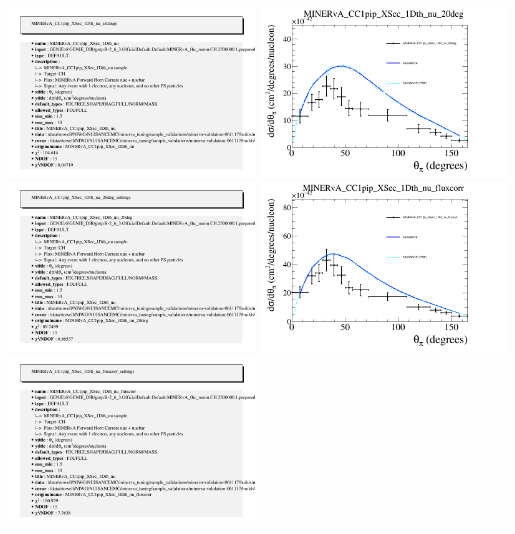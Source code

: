 \documentclass{article}
\begin{document}
\includegraphics[width=0.49\textwidth]{figures/nuisance_MINERvA_CC1pip_XSec_1Dth_nu_info.png}
\centering
\includegraphics[width=0.49\textwidth]{figures/nuisance_MINERvA_CC1pip_XSec_1Dth_nu_20deg_comp.png}
\includegraphics[width=0.49\textwidth]{figures/nuisance_MINERvA_CC1pip_XSec_1Dth_nu_20deg_info.png}
\centering
\includegraphics[width=0.49\textwidth]{figures/nuisance_MINERvA_CC1pip_XSec_1Dth_nu_fluxcorr_comp.png}
\includegraphics[width=0.49\textwidth]{figures/nuisance_MINERvA_CC1pip_XSec_1Dth_nu_fluxcorr_info.png}
\end{document}
